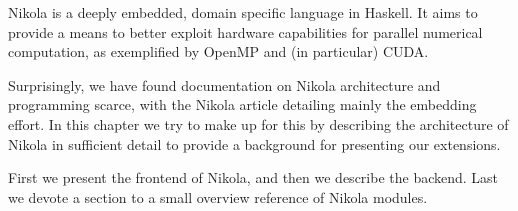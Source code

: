 
Nikola is a deeply embedded, domain specific language in Haskell. It aims to
provide a means to better exploit hardware capabilities for parallel numerical
computation, as exemplified by OpenMP and (in particular) CUDA.

Surprisingly, we have found documentation on Nikola architecture and
programming scarce, with the Nikola article \cite{mainland2010nikola}
detailing mainly the embedding effort. In this chapter we try to make up for
this by describing the architecture of Nikola in sufficient detail to provide a
background for presenting our extensions.

First we present the frontend of Nikola, and then we describe the backend. Last
we devote a section to a small overview reference of Nikola modules.
